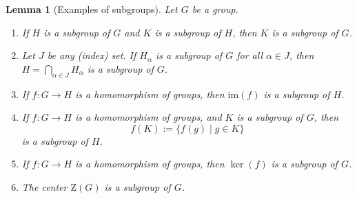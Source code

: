 \documentclass[12pt]{report}
\newtheorem{lemma}[theorem]{Lemma}
\numberwithin{equation}{section}
\numberwithin{theorem}{chapter}
\theoremstyle{definition}
\newtheorem*{basic properties}{Basic Properties}
\newtheorem*{Important Remark}{Important Remark}
\renewcommand{\ker}{\operatorname{ker}}
\begin{document}
\begin{lemma}[Examples of subgroups]\label{subgroups examples}
Let $G$ be a group.
\vspace{-0.3em}
\begin{enumerate}[leftmargin=20pt,itemsep=-0.1em,label=(\alph*)]
\item If $H$ is a subgroup of $G$ and $K$ is a subgroup of $H$, then $K$ is a subgroup of $G$. 
\item Let $J$ be any (index) set. If $H_\alpha$ is a subgroup of $G$ for all $\alpha \in J$, then $H=\bigcap_{\alpha\in J} H_\alpha$ is a subgroup of $G$.
 \item If $f: G \to H$ is a homomorphism of groups, then $\mathrm{im}(f)$ is a subgroup of $H$.
 \item If $f: G \to H$ is a homomorphism of groups, and $K$ is a subgroup of $G$, then 
 $$f(K) := \{ f(g) \mid g \in K \}$$
is a subgroup of $H$.
 \item If $f: G \to H$ is a homomorphism of groups, then $\ker(f)$ is a subgroup of $G$.
 \item The center $\mathrm{Z}(G)$ is a subgroup of $G$.
\end{enumerate}
\end{lemma}
\end{document}
